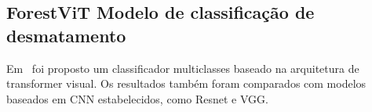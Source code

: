 \subsection{ForestViT Modelo de classificação de desmatamento}\label{sec:Cap2_ForestViT}

Em~\cite{9701667} foi proposto um classificador multiclasses baseado na arquitetura de transformer visual. Os resultados também foram comparados com modelos baseados em CNN estabelecidos, como Resnet e VGG. 





